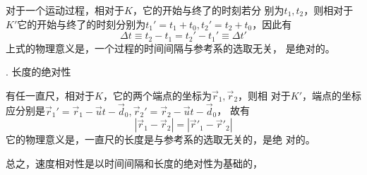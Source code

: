 \documentclass[../outline-of-mechanics.tex]{subfiles}
\begin{document}
对于一个运动过程，相对于$K$，它的开始与终了的时刻若分
别为$t_1,t_2$，则相对于$K'$它的开始与终了的时刻分别为$t_1'=t_1+t_0,t_2'=t_2+t_0$，因此有
\begin{equation}\label{eqn:02.05.05}
  \Delta t \equiv t_2 - t_1 = t_2' - t_1' \equiv \Delta t'
\end{equation}
上式的物理意义是，一个过程的时间间隔与参考系的选取无关，
是绝对的。

. 长度的绝对性 \normalfont

有任一直尺，相对于$K$，它的两个端点的坐标为$\vec{r}_1,\vec{r}_2$，则相
对于$K'$，端点的坐标应分别是$\vec{r}_1' = \vec{r}_1 - \vec{u} t - \vec{d}_0,\vec{r}_2' = \vec{r}_2 - \vec{u} t - \vec{d}_0$，
故有
\begin{equation}\label{eqn:02.05.06}
  |\vec{r}_1 - \vec{r}_2| = |\vec{r}'_1 - \vec{r}'_2|
\end{equation}
它的物理意义是，一直尺的长度是与参考系的选取无关的，是绝
对的。

总之，速度相对性是以时间间隔和长度的绝对性为基础的，
\end{document}

